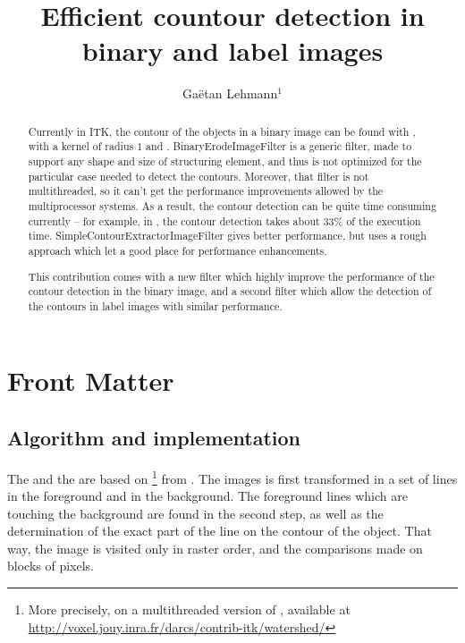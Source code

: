 \documentclass{InsightArticle}
\title{Efficient countour detection in binary and label images}
\author{Ga\"etan Lehmann{$^1$}}
\begin{document}
\maketitle

\ifhtml
\chapter*{Front Matter\label{front}}
\fi


\begin{abstract}
\noindent
Currently in ITK, the contour of the objects in a binary image can be found with , with a kernel of radius $1$ and . BinaryErodeImageFilter is a generic filter, made to support any shape and size of structuring element, and thus is not optimized for the particular case needed to detect the contours. Moreover, that filter is not multithreaded, so it can't get the performance improvements allowed by the multiprocessor systems. As a result, the contour detection can be quite time consuming currently -- for example, in , the contour detection takes about 33\% of the execution time. SimpleContourExtractorImageFilter gives better performance, but uses a rough approach which let a good place for performance enhancements.

This contribution comes with a new filter which highly improve the performance of the contour detection in the binary image, and a second filter which allow the detection of the contours in label images with similar performance.

\end{abstract}


\section{Algorithm and implementation}

The  and the  are based on \footnote{More precisely, on a multithreaded version of , available at \\ \url{http://voxel.jouy.inra.fr/darcs/contrib-itk/watershed/}} from \cite{Beare:2006p42}. The images is first transformed in a set of lines in the foreground and in the background. The foreground lines which are touching the background are found in the second step, as well as the determination of the exact part of the line on the contour of the object. That way, the image is visited only in raster order, and the comparisons made on blocks of pixels.
\end{document}
